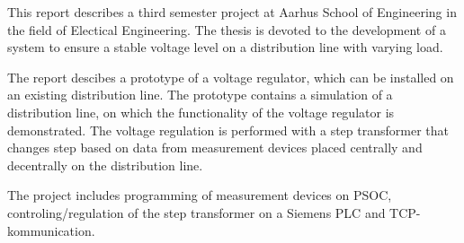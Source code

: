 
This report describes a third semester project at Aarhus School of Engineering in the field of Electical Engineering. The thesis is devoted to the development of a system to ensure a stable voltage level on a distribution line with varying load.

The report descibes a prototype of a voltage regulator, which can be installed on an existing distribution line. The prototype contains a simulation of a distribution line, on which the functionality of the voltage regulator is demonstrated. The voltage regulation is performed with a step transformer that changes step based on data from measurement devices placed centrally and decentrally on the distribution line. 

The project includes programming of measurement devices on PSOC, controling/regulation of the step transformer on a Siemens PLC and TCP-kommunication.

